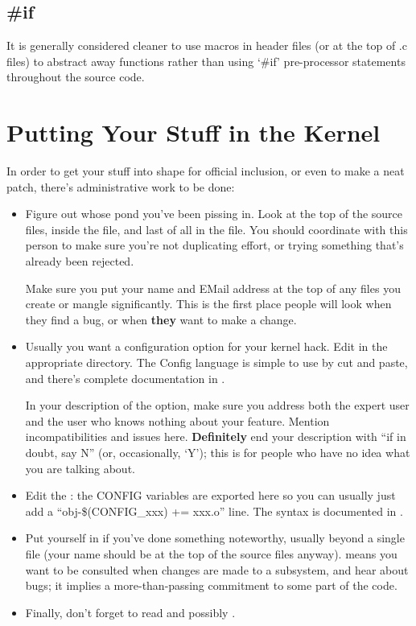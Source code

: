 \documentclass[a4paper,8pt,english]{sphinxmanual}
\begin{document}
\subsection{\#if}
\label{kernel-hacking/hacking:if}
It is generally considered cleaner to use macros in header files (or at
the top of .c files) to abstract away functions rather than using {}`\#if'
pre-processor statements throughout the source code.


\section{Putting Your Stuff in the Kernel}
\label{kernel-hacking/hacking:putting-your-stuff-in-the-kernel}
In order to get your stuff into shape for official inclusion, or even to
make a neat patch, there's administrative work to be done:
\begin{itemize}
\item {} 
Figure out whose pond you've been pissing in. Look at the top of the
source files, inside the  file, and last of all in the
 file. You should coordinate with this person to make sure
you're not duplicating effort, or trying something that's already
been rejected.

Make sure you put your name and EMail address at the top of any files
you create or mangle significantly. This is the first place people
will look when they find a bug, or when \textbf{they} want to make a change.

\item {} 
Usually you want a configuration option for your kernel hack. Edit
 in the appropriate directory. The Config language is
simple to use by cut and paste, and there's complete documentation in
.

In your description of the option, make sure you address both the
expert user and the user who knows nothing about your feature.
Mention incompatibilities and issues here. \textbf{Definitely} end your
description with “if in doubt, say N” (or, occasionally, {}`Y'); this
is for people who have no idea what you are talking about.

\item {} 
Edit the : the CONFIG variables are exported here so you
can usually just add a ``obj-\$(CONFIG\_xxx) += xxx.o'' line. The syntax
is documented in .

\item {} 
Put yourself in  if you've done something noteworthy,
usually beyond a single file (your name should be at the top of the
source files anyway).  means you want to be consulted
when changes are made to a subsystem, and hear about bugs; it implies
a more-than-passing commitment to some part of the code.

\item {} 
Finally, don't forget to read
 and possibly
.

\end{itemize}
\end{document}
